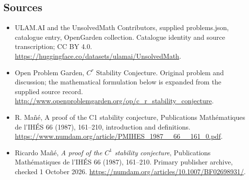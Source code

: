 \documentclass[11pt,a4paper]{article}
\begin{document}
\subsection{Sources}
\begin{itemize}
\item[S1] ULAM.AI and the UnsolvedMath Contributors, supplied problems.json, catalogue entry, OpenGarden collection. Catalogue identity and source transcription; CC BY 4.0.
\url{https://huggingface.co/datasets/ulamai/UnsolvedMath}.
\item[S2] Open Problem Garden, $C^r$ Stability Conjecture. Original problem and discussion; the mathematical formulation below is expanded from the supplied source record.
\url{http://www.openproblemgarden.org/op/c_r_stability_conjecture}.
\item[S3] R. Mañé, A proof of the C1 stability conjecture, Publications Mathématiques de l’IHÉS 66 (1987), 161–210, introduction and definitions.
\url{https://www.numdam.org/article/PMIHES_1987__66__161_0.pdf}.

\item[R1] Ricardo Ma\~n\'e, \emph{A proof of the $C^1$ stability
conjecture}, Publications Math\'ematiques de l'IH\'ES 66 (1987),
161--210. Primary publisher archive, checked 1 October 2026.
\url{https://numdam.org/articles/10.1007/BF02698931/}.

\end{itemize}
\end{document}
